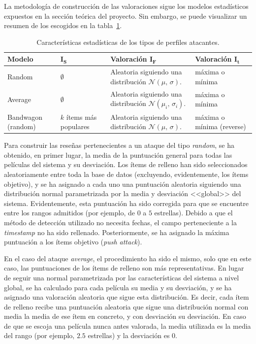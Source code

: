 La metodología de construcción de las valoraciones sigue los modelos estadísticos expuestos en la sección teórica del proyecto. Sin embargo, se puede visualizar un resumen de los escogidos en la tabla~\ref{ataques_coforest}.

\begin{table}
\begin{centering}
	
	\begin{tabular}{@{}p{5em} p{5em} p{11em} p{9em}@{}}
		\toprule
		\textbf{Modelo} & $\mathbf{I_S}$ & \textbf{Valoración} $\mathbf{I_F}$ &  \textbf{Valoración} $\mathbf{I_t}$\\ 
		\midrule
		Random & $\emptyset$ & Aleatoria siguiendo una distribución $\mathcal{N}(\mu,\,\sigma)$. & máxima o mínima \\
		Average & $\emptyset$ & Aleatoria siguiendo una distribución $\mathcal{N}(\mu_i,\,\sigma_i)$. & máxima o mínima\\
		Bandwagon (random) & $k$ ítems más populares & Aleatoria siguiendo una distribución $\mathcal{N}(\mu,\,\sigma)$. & máxima o mínima (reverse) \\
		\bottomrule
	\end{tabular}
	\caption{Características estadísticas de los tipos de perfiles atacantes.}
	\label{ataques_coforest}	

\end{centering}
\end{table}

Para construir las reseñas pertenecientes a un ataque del tipo \textit{random}, se ha obtenido, en primer lugar, la media de la puntuación general para todas las películas del sistema y su desviación. Los ítems de relleno han sido seleccionados aleatoriamente entre toda la base de datos (excluyendo, evidentemente, los ítems objetivo), y se ha asignado a cada uno una puntuación aleatoria siguiendo una distribución normal parametrizada por la media y desviación <<global>> del sistema. Evidentemente, esta puntuación ha sido corregida para que se encuentre entre los rangos admitidos (por ejemplo, de $0$ a $5$ estrellas). Debido a que el método de detección utilizado no necesita fechas, el campo perteneciente a la \textit{timestamp} no ha sido rellenado. Posteriormente, se ha asignado la máxima puntuación a los ítems objetivo (\textit{push attack}).

En el caso del ataque \textit{average}, el procedimiento ha sido el mismo, solo que en este caso, las puntuaciones de los ítems de relleno son más representativas. En lugar de seguir una normal parametrizada por las características del sistema a nivel global, se ha calculado para cada película su media y su desviación, y se ha asignado una valoración aleatoria que sigue esta distribución. Es decir, cada ítem de relleno recibe una puntuación aleatoria que sigue una distribución normal con media la media de ese ítem en concreto, y con desviación su desviación. En caso de que se escoja una película nunca antes valorada, la media utilizada es la media del rango (por ejemplo, $2.5$ estrellas) y la desviación es $0$.

